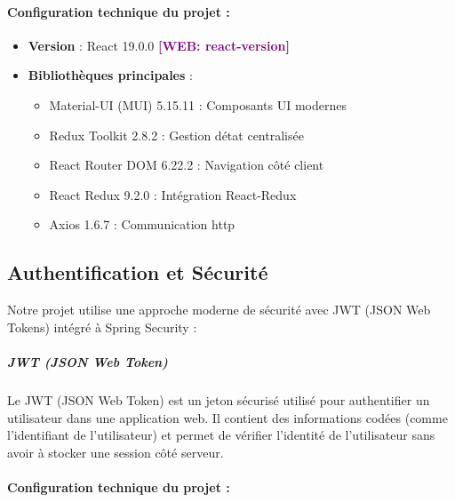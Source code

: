 \documentclass[12pt,a4paper,twoside,openright]{report}
\newcommand{\webref}[1]{\textcolor{purple}{\textbf{[WEB: #1]}}}
\begin{document}
\hypertarget{configuration-technique-du-projet-1}{%
\paragraph{\texorpdfstring{\textbf{Configuration technique du projet
:}}{Configuration technique du projet :}}\label{configuration-technique-du-projet-1}}

\begin{itemize}
\item
  \textbf{Version} : React 19.0.0 \webref{react-version}
\item
  \textbf{Bibliothèques principales} :

  \begin{itemize}
  \item
    Material-UI (MUI) 5.15.11 : Composants UI modernes
  \item
    Redux Toolkit 2.8.2 : Gestion d\textquotesingle état centralisée
  \item
    React Router DOM 6.22.2 : Navigation côté client
  \item
    React Redux 9.2.0 : Intégration React-Redux
  \item
    Axios 1.6.7 : Communication http
  \end{itemize}
\end{itemize}

\hypertarget{authentification-et-suxe9curituxe9}{%
\subsection{Authentification et
Sécurité}\label{authentification-et-suxe9curituxe9}}

Notre projet utilise une approche moderne de sécurité avec JWT (JSON Web
Tokens) intégré à Spring Security :

\hypertarget{jwt-json-web-token}{%
\subparagraph{\texorpdfstring{\textbf{JWT} \textbf{(JSON Web
Token)}}{JWT (JSON Web Token)}}\label{jwt-json-web-token}}

Le JWT (JSON Web Token) est un jeton sécurisé utilisé pour authentifier
un utilisateur dans une application web. Il contient des informations
codées (comme l'identifiant de l'utilisateur) et permet de vérifier
l'identité de l'utilisateur sans avoir à stocker une session côté
serveur.

\hypertarget{configuration-technique-du-projet-2}{%
\paragraph{\texorpdfstring{\textbf{Configuration technique du projet
:}}{Configuration technique du projet :}}\label{configuration-technique-du-projet-2}}
\end{document}
